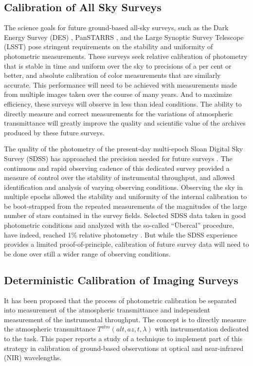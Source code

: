 \documentclass[manuscript]{aastex}
\begin{document}
\subsection{Calibration of All Sky Surveys}

The science goals for future ground-based all-sky surveys, such as the Dark Energy Survey (DES) \cite{flaugher07}                         ,
PanSTARRS \cite{kaiser02}, and the Large Synoptic Survey Telescope (LSST) \cite{ivezic09}
pose stringent requirements on the stability and uniformity of photometric measurements.
These surveys seek relative calibration of photometry that is stable in time and uniform over the sky to precisions of a per cent or better, 
and absolute calibration of color measurements that are similarly accurate.
This performance will need to be achieved with measurements made from multiple images taken over the course of many years.
And to maximize efficiency, these surveys will observe in less than ideal conditions.
The ability to directly measure and correct measurements for the variations of atmospheric transmittance will greatly
improve the quality and scientific value of the archives produced by these future surveys.

The quality of the photometry of the present-day multi-epoch Sloan Digital Sky Survey (SDSS) has
approached the precision needed for future surveys \cite{stoughton02} \cite{ivezic04}.
The continuous and rapid observing cadence of this dedicated survey provided a measure of control over the stability of instrumental throughput,
and allowed identification and analysis of varying observing conditions.
Observing the sky in multiple epochs allowed the stability and uniformity of the internal calibration to be boot-strapped from the repeated measurements
of the magnitudes of the large number of stars contained in the survey fields.  
Selected SDSS data taken in good photometric conditions and analyzed with the so-called ``\"Ubercal'' procedure, have indeed,
reached 1\% relative photometry \cite{ivezic07} \cite{padman08}.
But while the SDSS experience provides a limited proof-of-principle, calibration of future survey data will need
to be done over still a wider range of observing conditions.

\subsection{Deterministic Calibration of Imaging Surveys}

It has been proposed \cite{sandt06} that the process of photometric calibration be
separated into measurement of the atmospheric transmittance and independent measurement of the instrumental throughput. 
The concept is to directly measure the atmospheric transmittance $T^{atm}(alt,az,t,\lambda)$ with instrumentation dedicated to the task.
This paper reports a study of a technique to implement part of this strategy in
calibration of ground-based observations at optical and near-infrared (NIR) wavelengths.
\end{document}
